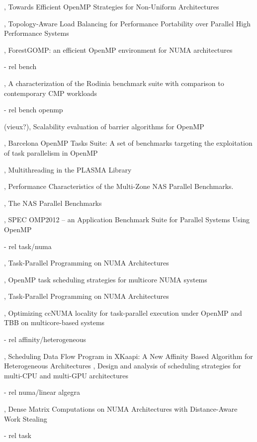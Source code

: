 \cite{Tahan2014}, Towards Efficient OpenMP Strategies for Non-Uniform Architectures

\cite{Pilla2014}, Topology-Aware Load Balancing for Performance Portability over Parallel High Performance Systems

\cite{Broquedis2010a}, ForestGOMP: an efficient OpenMP environment for NUMA architectures

  - rel bench

\cite{Rodinia2010}, A characterization of the Rodinia benchmark suite with comparison to contemporary CMP workloads

  - rel bench openmp

(vieux?)\cite{Nanjegowda2009}, Scalability evaluation of barrier algorithms for OpenMP

\cite{Duran2009}, Barcelona OpenMP Tasks Suite: A set of benchmarks targeting the exploitation of task parallelism in OpenMP

\cite{Kurzak2013}, Multithreading in the PLASMA Library

\cite{Jin2004}, Performance Characteristics of the Multi-Zone NAS Parallel Benchmarks.

\cite{Bailey1994}, The NAS Parallel Benchmarks

\cite{Muller2012}, SPEC OMP2012 -- an Application Benchmark Suite for Parallel Systems Using OpenMP

  - rel task/numa

\cite{Wienke2012}, Task-Parallel Programming on NUMA Architectures

\cite{Olivier2012}, OpenMP task scheduling strategies for multicore NUMA systems

\cite{Terboven2012}, Task-Parallel Programming on NUMA Architectures

\cite{Wittmann2011}, Optimizing ccNUMA locality for task-parallel execution under OpenMP and TBB on multicore-based systems


  - rel affinity/heterogeneous

\cite{Bleuse2014}, Scheduling Data Flow Program in XKaapi: A New Affinity Based Algorithm for Heterogeneous Architectures
\cite{Lima2015}, Design and analysis of scheduling strategies for multi-CPU and multi-GPU architectures

  - rel numa/linear algegra

\cite{Al-Omairy2015}, Dense Matrix Computations on NUMA Architectures with Distance-Aware Work Stealing

  - rel task

